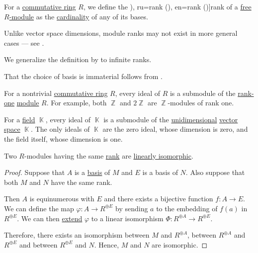 \begin{definition}\label{def:module_rank}\mimprovised
  For a \hyperref[def:ring/commutative]{commutative ring} \( R \), we define the \term[bg=rank (\cite[32]{КоцевСидеров2016КомутативнаАлгебра}), ru=rank (\cite[47]{Шафаревич1999ОсновныеПонятияАлгебры}), en=rank (\cite[171]{Jacobson1985BasicAlgebraI})]{rank} of a \hyperref[rem:free_module]{free \( R \)-module} as the \hyperref[thm:cardinality_existence]{cardinality} of any of its bases.
\end{definition}
\begin{comments}
  \item Unlike vector space dimensions, module ranks may not exist in more general cases --- see .
  \item We generalize the definition by  to infinite ranks.
\end{comments}
\begin{defproof}
  That the choice of basis is immaterial follows from .
\end{defproof}

\begin{example}\label{ex:field_submodules}
  For a nontrivial \hyperref[def:ring/commutative]{commutative ring} \( R \), every ideal of \( R \) is a submodule of the \hyperref[def:module_rank]{rank-one} \hyperref[def:module]{module} \( R \). For example, both \( \BbbZ \) and \( 2\BbbZ \) are \( \BbbZ \)-modules of rank one.

  For a \hyperref[def:field]{field} \( \BbbK \), every ideal of \( \BbbK \) is a submodule of the \hyperref[thm:vector_space_dimension]{unidimensional} \hyperref[def:vector_space]{vector space} \( \BbbK \). The only ideals of \( \BbbK \) are the zero ideal, whose dimension is zero, and the field itself, whose dimension is one.
\end{example}

\begin{proposition}\label{thm:modules_with_same_rank_are_isomorphic}
  Two \( R \)-modules having the same \hyperref[def:module_rank]{rank} are \hyperref[def:linear_function]{linearly isomorphic}.
\end{proposition}
\begin{proof}
  Suppose that \( A \) is a \hyperref[def:hamel_basis]{basis} of \( M \) and \( E \) is a basis of \( N \). Also suppose that both \( M \) and \( N \) have the same rank.

  Then \( A \) is equinumerous with \( E \) and there exists a bijective function \( f: A \to E \). We can define the map \( \varphi: A \to R^{\oplus E} \) by sending \( a \) to the embedding of \( f(a) \) in \( R^{\oplus E} \). We can then \hyperref[thm:free_semimodule_universal_property]{extend} \( \varphi \) to a linear isomorphism \( \Phi: R^{\oplus A} \to R^{\oplus E} \).

  Therefore, there exists an isomorphism between \( M \) and \( R^{\oplus A} \), between \( R^{\oplus A} \) and \( R^{\oplus E} \) and between \( R^{\oplus E} \) and \( N \). Hence, \( M \) and \( N \) are isomorphic.
\end{proof}

